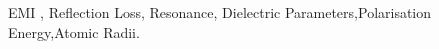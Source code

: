 \documentclass[journal]{IEEEtran}
\begin{document}
\begin{IEEEkeywords}
EMI , Reflection Loss, Resonance, Dielectric Parameters,Polarisation Energy,Atomic Radii.
\end{IEEEkeywords}






%
\IEEEpeerreviewmaketitle
\end{document}
